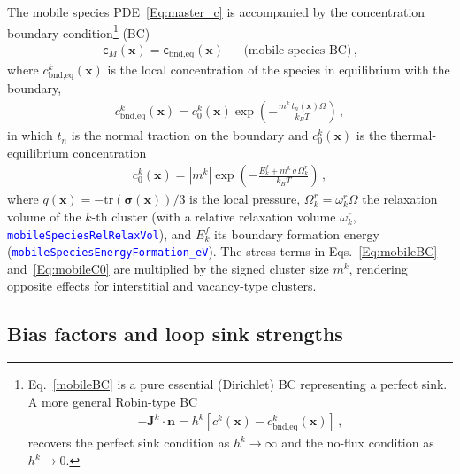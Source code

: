 \documentclass{article}
\newcommand{\textttclr}[1]{\textcolor{blue}{\texttt{#1}}}
\newcommand{\spvec}[1]{\bm{\mathsf{#1}}}   %
\begin{document}
The mobile species PDE~\eqref{Eq:master_c} is accompanied by the concentration boundary condition\footnote{
Eq.~\eqref{mobileBC} is a pure essential (Dirichlet) BC representing a perfect sink. A more general Robin-type BC
\begin{align}
-\bm J^k\cdot \bm n = h^k\left[c^k(\bm x)-c^k_\text{bnd,eq}(\bm x)\right]\, ,
\end{align}
recovers the perfect sink condition as $h^k\rightarrow\infty$ and the no-flux condition as $h^k\rightarrow0$.
}
(BC)
\begin{align}
\spvec{c}_M(\bm x)=\spvec{c}_\text{bnd,eq}(\bm x) && \text{(mobile species BC)}\, ,
\label{mobileBC}
\end{align}
where $c^k_\text{bnd,eq}(\bm x)$ is the local concentration of the species in equilibrium with the boundary,
\begin{align}
c^k_\text{bnd,eq}(\bm x)=c^k_0(\bm x)\exp\left(-\frac{m^k\,t_n(\bm x)\Omega}{k_BT}\right) \, ,
\label{Eq:mobileBC}
\end{align}
in which $t_n$ is the normal traction on the boundary and $c^k_0(\bm x)$ is the thermal-equilibrium concentration
\begin{align}
c^k_0(\bm x)= |m^k|\exp\left(-\frac{E^f_k+m^k\,q\,\Omega_k^r}{k_BT}\right)\, ,
\label{Eq:mobileC0}
\end{align}
where $q(\bm x)=-\text{tr}(\bm\sigma(\bm x))/3$ is the local pressure, $\Omega_k^r=\omega_k^r\Omega$ the relaxation volume of the $k$-th cluster (with a relative relaxation volume $\omega_k^r$, \textttclr{mobileSpeciesRelRelaxVol}), and $E_k^f$ its boundary formation energy (\textttclr{mobileSpeciesEnergyFormation\_eV}). The stress terms in Eqs.~\eqref{Eq:mobileBC} and~\eqref{Eq:mobileC0} are multiplied by the signed cluster size $m^k$, rendering opposite effects for interstitial and vacancy-type clusters.



\subsection{Bias factors and loop sink strengths}
\label{sec:biasAndSinks}
\end{document}
